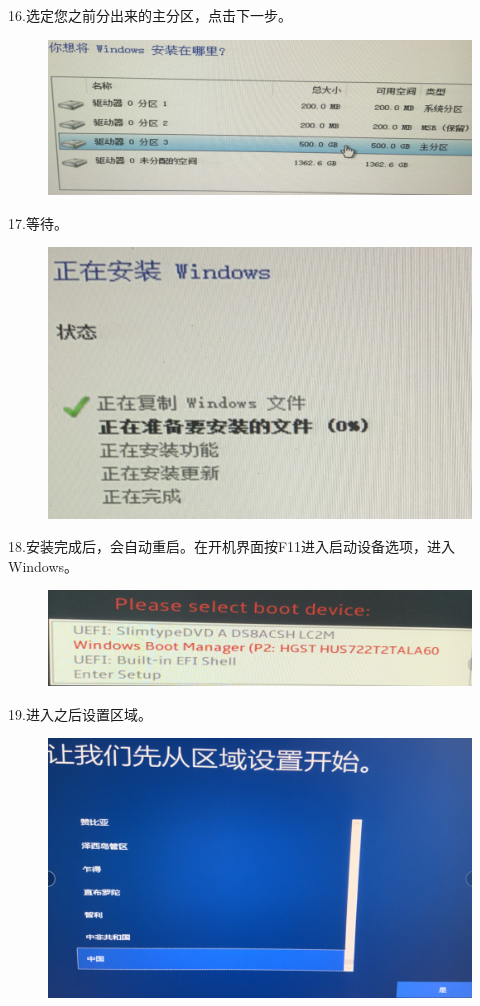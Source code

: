 \documentclass[openbib]{article}
\begin{document}
16.选定您之前分出来的主分区，点击下一步。
\begin{figure}[htbp]
	\centering
	\includegraphics[scale=0.3]{17}
\end{figure}

17.等待。
\begin{figure}[htbp]
	\centering
	\includegraphics[scale=0.3]{18}
\end{figure}

18.安装完成后，会自动重启。在开机界面按F11进入启动设备选项，进入Windows。
\begin{figure}[htbp]
	\centering
	\includegraphics[scale=0.3]{19}
\end{figure}

19.进入之后设置区域。
\begin{figure}[htbp]
	\centering
	\includegraphics[scale=0.24]{20}
\end{figure}
\end{document}
